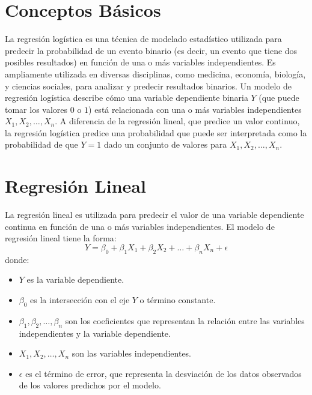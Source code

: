 \section{Conceptos Básicos}

La regresión logística es una técnica de modelado estadístico utilizada para predecir la probabilidad de un evento binario (es decir, un evento que tiene dos posibles resultados) en función de una o más variables independientes. Es ampliamente utilizada en diversas disciplinas, como medicina, economía, biología, y ciencias sociales, para analizar y predecir resultados binarios.  Un modelo de regresión logística describe cómo una variable dependiente binaria $Y$ (que puede tomar los valores $0$ o $1$) está relacionada con una o más variables independientes $X_1, X_2, \ldots, X_n$. A diferencia de la regresión lineal, que predice un valor continuo, la regresión logística predice una probabilidad que puede ser interpretada como la probabilidad de que $Y=1$ dado un conjunto de valores para $X_1, X_2, \ldots, X_n$.

\section{Regresión Lineal}

La regresión lineal es utilizada para predecir el valor de una variable dependiente continua en función de una o más variables independientes. El modelo de regresión lineal tiene la forma:
\begin{equation}
Y = \beta_0 + \beta_1 X_1 + \beta_2 X_2 + \ldots + \beta_n X_n + \epsilon
\end{equation}
donde:
\begin{itemize}
    \item $Y$ es la variable dependiente.
    \item $\beta_0$ es la intersección con el eje $Y$ o término constante.
    \item $\beta_1, \beta_2, \ldots, \beta_n$ son los coeficientes que representan la relación entre las variables independientes y la variable dependiente.
    \item $X_1, X_2, \ldots, X_n$ son las variables independientes.
    \item $\epsilon$ es el término de error, que representa la desviación de los datos observados de los valores predichos por el modelo.
\end{itemize}


